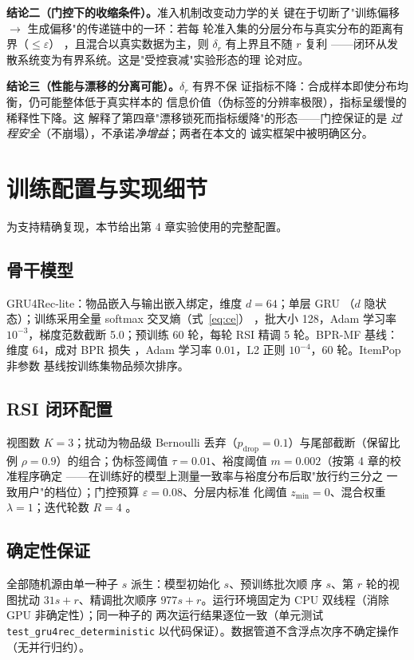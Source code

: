 \textbf{结论二（门控下的收缩条件）。}准入机制改变动力学的关
键在于切断了"训练偏移 $\to$ 生成偏移"的传递链中的一环：若每
轮准入集的分层分布与真实分布的距离有界（$\leq \varepsilon$）
，且混合以真实数据为主，则 $\delta_r$ 有上界且不随 $r$ 复利
——闭环从发散系统变为有界系统。这是"受控衰减"实验形态的理
论对应。

\textbf{结论三（性能与漂移的分离可能）。}$\delta_r$ 有界不保
证指标不降：合成样本即使分布均衡，仍可能整体低于真实样本的
信息价值（伪标签的分辨率极限），指标呈缓慢的稀释性下降。这
解释了第四章"漂移锁死而指标缓降"的形态——门控保证的是
\emph{过程安全}（不崩塌），不承诺\emph{净增益}；两者在本文的
诚实框架中被明确区分。

\section{训练配置与实现细节}
为支持精确复现，本节给出第 4 章实验使用的完整配置。

\subsection{骨干模型}
GRU4Rec-lite：物品嵌入与输出嵌入绑定，维度 $d=64$；单层 GRU
（$d$ 隐状态）；训练采用全量 softmax 交叉熵（式~\ref{eq:ce}）
，批大小 128，Adam 学习率 $10^{-3}$，梯度范数截断 5.0；预训练
60 轮，每轮 RSI 精调 5 轮。BPR-MF 基线：维度 64，成对 BPR 损失
，Adam 学习率 $0.01$，L2 正则 $10^{-4}$，60 轮。ItemPop 非参数
基线按训练集物品频次排序。

\subsection{RSI 闭环配置}
视图数 $K=3$；扰动为物品级 Bernoulli 丢弃（$p_{\mathrm{drop}}=
0.1$）与尾部截断（保留比例 $\rho = 0.9$）的组合；伪标签阈值
$\tau = 0.01$、裕度阈值 $m = 0.002$（按第 4 章的校准程序确定
——在训练好的模型上测量一致率与裕度分布后取"放行约三分之
一致用户"的档位）；门控预算 $\varepsilon = 0.08$、分层内标准
化阈值 $z_{\min} = 0$、混合权重 $\lambda = 1$；迭代轮数 $R=4$
。

\subsection{确定性保证}
全部随机源由单一种子 $s$ 派生：模型初始化 $s$、预训练批次顺
序 $s$、第 $r$ 轮的视图扰动 $31s + r$、精调批次顺序 $977s + r
$。运行环境固定为 CPU 双线程（消除 GPU 非确定性）；同一种子的
两次运行结果逐位一致（单元测试 \texttt{test\_gru4rec\_deterministic}
以代码保证）。数据管道不含浮点次序不确定操作（无并行归约）。

